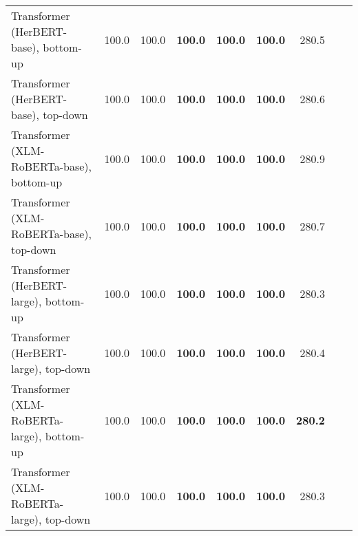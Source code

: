 \begin{table}[ht!]
{\begin{tabular}{lrrrrrrrr}
  Transformer (HerBERT-base), bottom-up & 100.0 & 100.0 & \textbf{100.0} & \textbf{100.0} & \textbf{100.0} & 280.5 \\ 
  Transformer (HerBERT-base), top-down & 100.0 & 100.0 & \textbf{100.0} & \textbf{100.0} & \textbf{100.0} & 280.6 \\ 
  Transformer (XLM-RoBERTa-base), bottom-up & 100.0 & 100.0 & \textbf{100.0} & \textbf{100.0} & \textbf{100.0} & 280.9 \\ 
  Transformer (XLM-RoBERTa-base), top-down & 100.0 & 100.0 & \textbf{100.0} & \textbf{100.0} & \textbf{100.0} & 280.7 \\ 
  Transformer (HerBERT-large), bottom-up & 100.0 & 100.0 & \textbf{100.0} & \textbf{100.0} & \textbf{100.0} & 280.3 \\ 
  Transformer (HerBERT-large), top-down & 100.0 & 100.0 & \textbf{100.0} & \textbf{100.0} & \textbf{100.0} & 280.4 \\ 
  Transformer (XLM-RoBERTa-large), bottom-up & 100.0 & 100.0 & \textbf{100.0} & \textbf{100.0} & \textbf{100.0} & \textbf{280.2} \\ 
  Transformer (XLM-RoBERTa-large), top-down & 100.0 & 100.0 & \textbf{100.0} & \textbf{100.0} & \textbf{100.0} & 280.3 \\ 
   \hline
\end{tabular}
}
\end{table}




